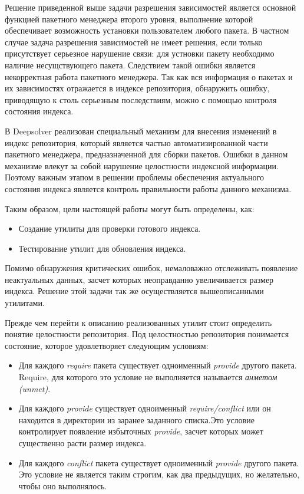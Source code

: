 \documentclass[a4paper]{article}
\begin{document}
Решение приведенной выше задачи разрешения зависимостей является основной функцией пакетного менеджера второго уровня, выполнение которой обеспечивает возможность установки пользователем любого пакета. В частном случае задача разрешения зависимостей не
имеет решения, если только присутствует серьезное нарушение связи: для
устновки пакету необходимо наличие несущствующего пакета. Следствием такой ошибки является некорректная работа пакетного менеджера. Так как вся информация о пакетах и их зависимостях отражается в индексе репозитория, обнаружить ошибку, приводящую к столь серьезным последствиям, можно с помощью контроля состояния индекса.

В  Deepsolver реализован специальный механизм для внесения изменений в индекс репозитория, который является частью автоматизированной части пакетного менеджера, предназначенной для сборки пакетов. Ошибки в данном механизме влекут за собой нарушение целостности индексной информации. Поэтому важным этапом в решении проблемы обеспечения актуального состояния индекса является контроль правильности работы данного механизма. 

Таким образом, цели настоящей работы могут быть определены, как:
\begin{itemize}
\item
Создание утилиты для проверки готового индекса.
\item
Тестирование утилит для обновления индекса.
\end{itemize}

Помимо обнаружения критических ошибок, немаловажно отслеживать появление неактуальных данных, засчет которых неоправданно увеличивается размер индекса. Решение этой задачи так же осуществляется
вышеописанными утилитами.%

Прежде чем перейти к описанию реализованных утилит стоит
определить понятие целостности репозитория. Под целостностью репозитория понимается состояние, которое удовлетворяет следующим
условиям:
\begin{itemize}
\item{Для каждого \textit{require} пакета существует одноименный \textit{provide} 
другого пакета. Require, для которого это условие не выполняется
называется \textit{анметом (unmet)}. }
\item{Для каждого \textit{provide} существует одноименный \textit{require/conflict} или
он находится в директории из заранее заданного списка.Это условие 
контролирует появление избыточных \textit{provide}, засчет которых
может существенно расти размер индекса.}
\item{Для каждого \textit{conflict} пакета существует одноименный \textit{provide} 
другого пакета. Это условие не является таким строгим, как два предыдущих,
но желательно, чтобы оно выполнялось. }
\end{itemize}
\end{document}
